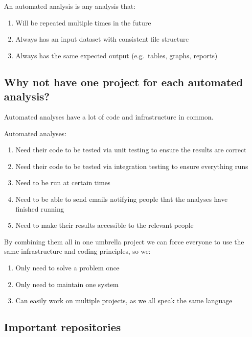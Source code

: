 \documentclass[12pt,]{article}
\providecommand{\tightlist}{%
  \setlength{\itemsep}{0pt}\setlength{\parskip}{0pt}}
\begin{document}
An automated analysis is any analysis that:

\begin{enumerate}
\def\labelenumi{\arabic{enumi}.}
\tightlist
\item
  Will be repeated multiple times in the future
\item
  Always has an input dataset with consistent file structure
\item
  Always has the same expected output (e.g.~tables, graphs, reports)
\end{enumerate}

\subsection{Why not have one project for each automated
analysis?}\label{why-not-have-one-project-for-each-automated-analysis}

Automated analyses have a lot of code and infrastructure in common.

Automated analyses:

\begin{enumerate}
\def\labelenumi{\arabic{enumi}.}
\tightlist
\item
  Need their code to be tested via unit testing to ensure the results
  are correct
\item
  Need their code to be tested via integration testing to ensure
  everything runs
\item
  Need to be run at certain times
\item
  Need to be able to send emails notifying people that the analyses have
  finished running
\item
  Need to make their results accessible to the relevant people
\end{enumerate}

By combining them all in one umbrella project we can force everyone to
use the same infrastructure and coding principles, so we:

\begin{enumerate}
\def\labelenumi{\arabic{enumi}.}
\tightlist
\item
  Only need to solve a problem once
\item
  Only need to maintain one system
\item
  Can easily work on multiple projects, as we all speak the same
  language
\end{enumerate}

\subsection{Important repositories}\label{important-repositories}
\end{document}
